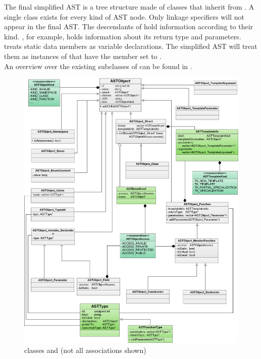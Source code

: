 The final simplified AST is a tree structure made of classes that inherit from
. A single class exists for every kind of AST node. Only linkage specifiers will not appear in the final AST. The descendants of  hold information according to their kind. , for example, holds information about its return type and parameters.  treats static data members as variable declarations. The simplified AST will treat them as instances of  that have the  member set to .\\
An overview over the existing subclasses of  can be found in .\\

\begin{figure}[h!] %
	\centering
		\includegraphics[scale=0.2]{Images/ASTObjectUML.png}
	\caption{ classes and  (not all associations shown)}
	\label{fig:ASTObjectUML}
\end{figure}

